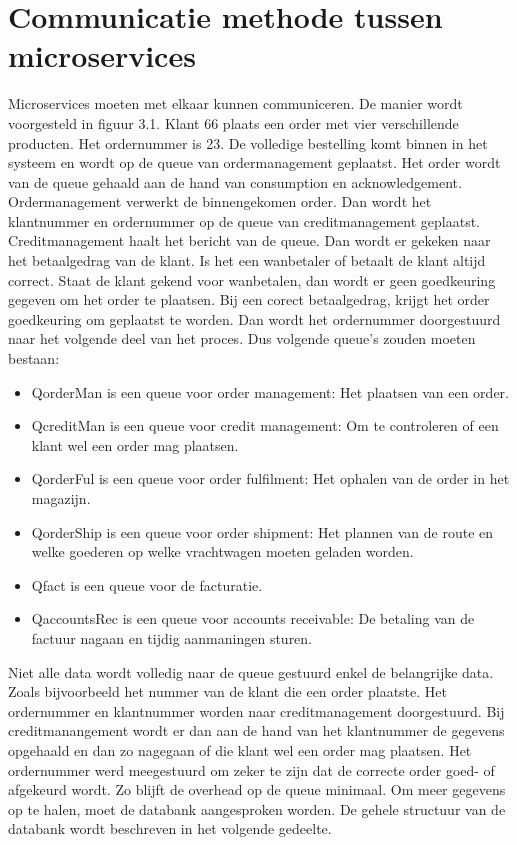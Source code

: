 \section{Communicatie methode tussen microservices}
Microservices moeten met elkaar kunnen communiceren. De manier wordt voorgesteld in figuur 3.1. 
Klant 66 plaats een order met vier verschillende producten. Het ordernummer is 23. De volledige bestelling komt binnen in het systeem en wordt op de queue van ordermanagement geplaatst. Het order wordt van de queue gehaald aan de hand van consumption en acknowledgement. Ordermanagement verwerkt de binnengekomen order. Dan wordt het klantnummer en ordernummer op de queue van creditmanagement geplaatst. Creditmanagement haalt het bericht van de queue. Dan wordt er gekeken naar het betaalgedrag van de klant. Is het een wanbetaler of betaalt de klant altijd correct. Staat de klant gekend voor wanbetalen, dan wordt er geen goedkeuring gegeven om het order te plaatsen. Bij een corect betaalgedrag, krijgt het order goedkeuring om geplaatst te worden. Dan wordt het ordernummer doorgestuurd naar het volgende deel van het proces. 
Dus volgende queue's zouden moeten bestaan:
\begin{itemize}
	\item QorderMan is een queue voor order management: Het plaatsen van een order.
	\item QcreditMan is een queue voor credit management: Om te controleren of een klant wel een order mag plaatsen.
	\item QorderFul is een queue voor order fulfilment: Het ophalen van de order in het magazijn.
	\item QorderShip is een queue voor order shipment: Het plannen van de route en welke goederen op welke vrachtwagen moeten geladen worden.
	\item Qfact is een queue voor de facturatie.
	\item QaccountsRec is een queue voor accounts receivable: De betaling van de factuur nagaan en tijdig aanmaningen sturen. 
\end{itemize}

Niet alle data wordt volledig naar de queue gestuurd enkel de belangrijke data. Zoals bijvoorbeeld het nummer van de klant die een order plaatste. Het ordernummer en klantnummer worden naar creditmanagement doorgestuurd. Bij creditmanangement wordt er dan aan de hand van het klantnummer de gegevens opgehaald en dan zo nagegaan of die klant wel een order mag plaatsen. Het ordernummer werd meegestuurd om zeker te zijn dat de correcte order goed- of afgekeurd wordt. Zo blijft de overhead op de queue minimaal. Om meer gegevens op te halen, moet de databank aangesproken worden. De gehele structuur van de databank wordt beschreven in het volgende gedeelte.


